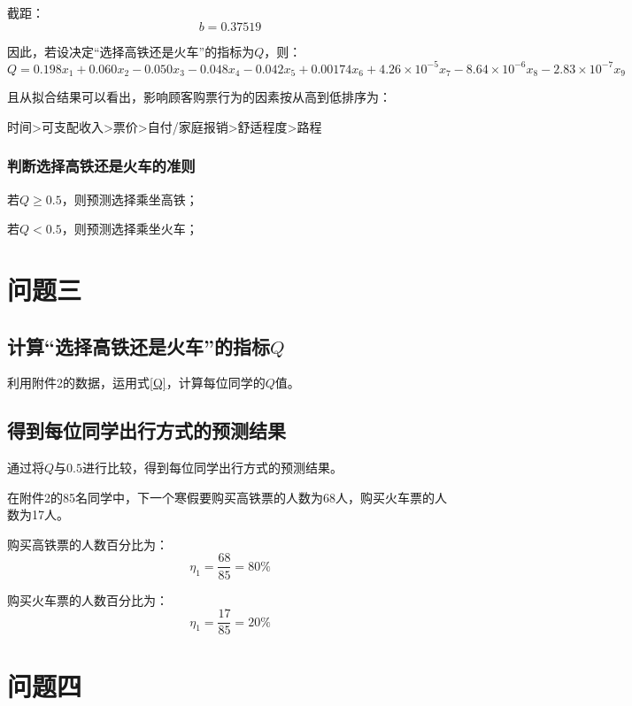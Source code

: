\documentclass{ctexart}
\newcounter{sub}
\begin{document}
截距：
\begin{equation}
	b=0.37519
\end{equation}

因此，若设决定\enquote{选择高铁还是火车}的指标为$Q$，则：
\begin{equation}
	Q=0.198x_1+0.060x_2-0.050x_3-0.048x_4-0.042x_5+0.00174x_6+4.26\times 10^{-5}x_7-8.64\times 10^{-6}x_8-2.83\times 1   \label{Q}
	0^{-7}x_9
\end{equation}

且从拟合结果可以看出，影响顾客购票行为的因素按从高到低排序为：

时间>可支配收入>票价>自付/家庭报销>舒适程度>路程

\subsubsection{判断选择高铁还是火车的准则}
若$Q \geqslant 0.5$，则预测选择乘坐高铁；

若$Q < 0.5$，则预测选择乘坐火车；

\section{问题三}%
\label{sec:问题三}
\subsection{计算\enquote{选择高铁还是火车}的指标$Q$}
利用附件2的数据，运用式\ref{Q}，计算每位同学的$Q$值。

\subsection{得到每位同学出行方式的预测结果}
通过将$Q$与$0.5$进行比较，得到每位同学出行方式的预测结果。

在附件2的85名同学中，下一个寒假要购买高铁票的人数为68人，购买火车票的人数为17人。

购买高铁票的人数百分比为：
\begin{equation}
	\eta_1=\frac{68}{85}=80\%
\end{equation}

购买火车票的人数百分比为：
\begin{equation}
	\eta_1=\frac{17}{85}=20\%
\end{equation}

\section{问题四}%
\label{sec:问题四}
\end{document}
